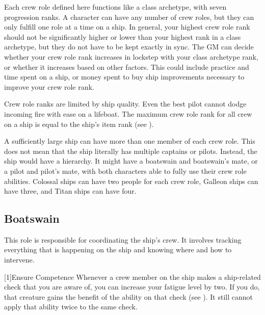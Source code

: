   Each crew role defined here functions like a class archetype, with seven progression ranks.
  A character can have any number of crew roles, but they can only fulfill one role at a time on a ship.
  In general, your highest crew role rank should not be significantly higher or lower than your highest rank in a class archetype, but they do not have to be kept exactly in sync.
  The GM can decide whether your crew role rank increases in lockstep with your class archetype rank, or whether it increases based on other factors.
  This could include practice and time spent on a ship, or money spent to buy ship improvements necessary to improve your crew role rank.

  Crew role ranks are limited by ship quality.
  Even the best pilot cannot dodge incoming fire with ease on a lifeboat.
  The maximum crew role rank for all crew on a ship is equal to the ship's item rank (see ).

  A sufficiently large ship can have more than one member of each crew role.
  This does not mean that the ship literally has multiple captains or pilots.
  Instead, the ship would have a hierarchy.
  It might have a boatswain and boatswain's mate, or a pilot and pilot's mate, with both characters able to fully use their crew role abilities.
  Colossal ships can have two people for each crew role, Galleon ships can have three, and Titan ships can have four.


  \subsection{Boatswain}
    This role is responsible for coordinating the ship's crew.
    It involves tracking everything that is happening on the ship and knowing where and how to intervene.

    [1]{Ensure Competence} Whenever a crew member on the ship makes a ship-related check that you are aware of, you can increase your fatigue level by two.
      If you do, that creature gains the benefit of the  ability on that check (see ).
      It still cannot apply that ability twice to the same check.


